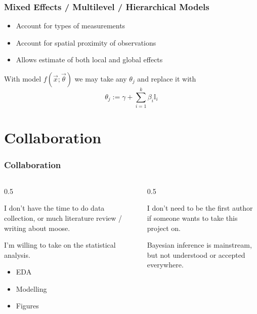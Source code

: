 \documentclass[compress, aspectratio=169]{beamer}
\begin{document}
\begin{frame}
	\frametitle{Mixed Effects / Multilevel / Hierarchical Models}
	\begin{cmarker}
	\begin{itemize}
		\item Account for types of measurements
		\item Account for spatial proximity of observations
		\item Allows estimate of both local and global effects
	\end{itemize}
	\end{cmarker}
	
	\begin{tmarker}
	With model $f(\vec x; \vec \theta)$ we may take any $\theta_j$ and replace it with
	$$\theta_j := \gamma + \sum_{i=1}^k \beta_i \mathbb{I}_i$$
	\end{tmarker}
\end{frame}

\section{Collaboration}

\begin{frame}
	\frametitle{Collaboration}
	\begin{columns}
	\begin{column}{0.5\textwidth}
	\begin{xmarker}
	I don't have the time to do data collection, or much literature review / writing about moose.
	\end{xmarker}
	\begin{cmarker}
	I'm willing to take on the statistical analysis.
	\begin{itemize}
		\item EDA
		\item Modelling
		\item Figures
	\end{itemize}
	\end{cmarker}
	\end{column}
	\begin{column}{0.5\textwidth}
	\begin{cmarker}
	I don't need to be the first author if someone wants to take this project on.
	\end{cmarker}
	\begin{imarker}
	Bayesian inference is mainstream, but not understood or accepted everywhere.
	\end{imarker}
	\end{column}
	\end{columns}
\end{frame}
\end{document}
